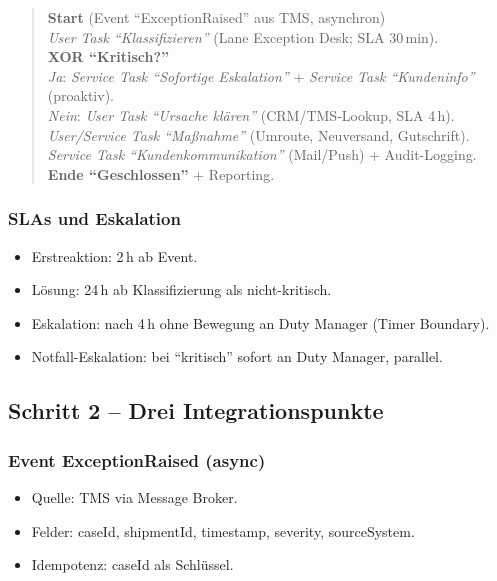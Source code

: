 \documentclass[11pt,a4paper,oneside]{article}
\begin{document}
\begin{quote}
\textbf{Start} (Event ``ExceptionRaised'' aus TMS, asynchron) \\
\textrightarrow{} \emph{User Task ``Klassifizieren''} (Lane Exception Desk; SLA 30\,min). \\
\textrightarrow{} \textbf{XOR ``Kritisch?''} \\
\qquad \emph{Ja}: \textrightarrow{} \emph{Service Task ``Sofortige Eskalation''} + \emph{Service Task ``Kundeninfo''} (proaktiv). \\
\qquad \emph{Nein}: \textrightarrow{} \emph{User Task ``Ursache klären''} (CRM/TMS-Lookup, SLA 4\,h). \\
\textrightarrow{} \emph{User/Service Task ``Maßnahme''} (Umroute, Neuversand, Gutschrift). \\
\textrightarrow{} \emph{Service Task ``Kundenkommunikation''} (Mail/Push) + Audit-Logging. \\
\textrightarrow{} \textbf{Ende ``Geschlossen''} + Reporting.
\end{quote}

\subsubsection{SLAs und Eskalation}

\begin{itemize}
  \item Erstreaktion: 2\,h ab Event.
  \item Lösung: 24\,h ab Klassifizierung als nicht-kritisch.
  \item Eskalation: nach 4\,h ohne Bewegung an Duty Manager (Timer Boundary).
  \item Notfall-Eskalation: bei ``kritisch'' sofort an Duty Manager, parallel.
\end{itemize}

\subsection{Schritt 2 -- Drei Integrationspunkte}

\subsubsection{Event ExceptionRaised (async)}

\begin{itemize}
  \item Quelle: TMS via Message Broker.
  \item Felder: caseId, shipmentId, timestamp, severity, sourceSystem.
  \item Idempotenz: caseId als Schlüssel.
\end{itemize}
\end{document}
